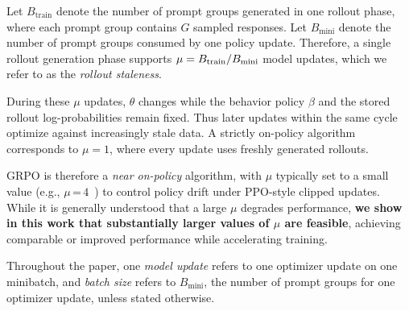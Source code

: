 Let $B_{\mathrm{train}}$ denote the number of prompt groups generated in one
rollout phase, where each prompt group contains $G$ sampled responses. Let
$B_{\mathrm{mini}}$ denote the number of prompt groups consumed by one policy
update. Therefore, a
single rollout generation phase supports $\mu = {B_{\rm train}}/{B_{\rm mini}}$ model updates, which we refer to as the \textit{rollout staleness}.

During these $\mu$ updates, $\theta$ changes while the behavior policy $\beta$
and the stored rollout log-probabilities remain fixed. Thus later updates within
the same cycle optimize against increasingly stale data. A strictly on-policy
algorithm corresponds to $\mu=1$, where every update uses freshly generated
rollouts. 

GRPO is therefore a \emph{near on-policy} algorithm, with $\mu$ typically set to a small value (e.g., $\mu\,$=$\,4$~\citep{zheng2025act,wang2025reinforcement,yu2025dapoopensourcellmreinforcement,chen2025minimax,zheng2025group}) to control policy drift under PPO-style clipped updates. 
While it is generally understood that a large $\mu$ degrades performance,\textbf{ we show in this work that substantially larger values of \boldmath $\mu$ are feasible}, achieving comparable or improved performance while accelerating training.

Throughout the paper, one \emph{model update} refers to one optimizer update on
one minibatch, and \emph{batch size} refers to $B_{\mathrm{mini}}$, the number of prompt groups for
one optimizer update, unless stated
otherwise.